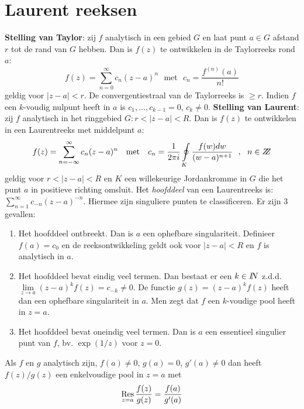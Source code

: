 \section{Laurent reeksen}
{\bf Stelling van Taylor}: zij $f$ analytisch in een gebied $G$ en laat punt
$a\in G$ afstand $r$ tot de rand van $G$ hebben. Dan is $f(z)$ te ontwikkelen
in de Taylorreeks rond $a$:
\[
f(z)=\sum_{n=0}^\infty c_n(z-a)^n~~~\mbox{met}~~~c_n=\frac{f^{(n)}(a)}{n!}
\]
geldig voor $|z-a|<r$. De convergentiestraal van de Taylorreeks is $\geq r$.
Indien $f$ een $k$-voudig nulpunt heeft in $a$ is $c_1,...,c_{k-1}=0$, $c_k\neq0$.
\npar
{\bf Stelling van Laurent}: zij $f$ analytisch in het ringgebied
$G:r<|z-a|<R$. Dan is $f(z)$ te ontwikkelen in een Laurentreeks met
middelpunt $a$:
\[
f(z)=\sum_{n=-\infty}^\infty c_n(z-a)^n~~~\mbox{met}~~~
c_n=\frac{1}{2\pi i}\oint\limits_K\frac{f(w)dw}{(w-a)^{n+1}}~~,~~n\in Z\hspace{-1ex}Z
\]
geldig voor $r<|z-a|<R$ en $K$ een willekeurige Jordankromme in $G$ die het
punt $a$ in positieve richting omsluit.
\npar
Het {\it hoofddeel} van een Laurentreeks is: $\sum\limits_{n=1}^\infty c_{-n}(z-a)^{-n}$.
Hiermee zijn singuliere punten te classificeren. Er zijn 3 gevallen:
\begin{enumerate}
\item Het hoofddeel ontbreekt. Dan is $a$ een ophefbare singulariteit.
      Definieer $f(a)=c_0$ en de reeksontwikkeling geldt ook voor $|z-a|<R$
      en $f$ is analytisch in $a$.
\item Het hoofddeel bevat eindig veel termen. Dan bestaat er een $k\in I\hspace{-1mm}N$ z.d.d.
      $\lim\limits_{z\rightarrow a}(z-a)^kf(z)=c_{-k}\neq0$. De functie
      $g(z)=(z-a)^kf(z)$ heeft dan een ophefbare singulariteit in $a$. Men
      zegt dat $f$ een $k$-voudige pool heeft in $z=a$.
\item Het hoofddeel bevat oneindig veel termen. Dan is $a$ een essentieel
      singulier punt van $f$, bv. $\exp(1/z)$ voor $z=0$.
\end{enumerate}
Als $f$ en $g$ analytisch zijn, $f(a)\neq0$, $g(a)=0$, $g'(a)\neq0$ dan heeft
$f(z)/g(z)$ een enkelvoudige pool in $z=a$ met
\[
\mathop{\rm Res}\limits_{z=a}\frac{f(z)}{g(z)}=\frac{f(a)}{g'(a)}
\]

